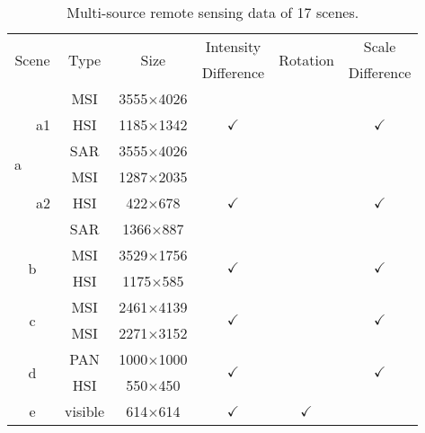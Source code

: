 \begin{table}[h!]
 \centering
 \setlength{\tabcolsep}{1.2mm}
 \caption{Multi-source remote sensing data of 17 scenes.}
 \label{tbl:data}
 \begin{tabular}{ccccccc}
  \toprule
   \multicolumn{2}{c}{\multirow{2}{*}{Scene}} & \multirow{2}{*}{Type} & \multirow{2}{*}{Size} & Intensity  & \multirow{2}{*}{Rotation} & Scale \\
                      &                       &                       &                       & Difference &                           & Difference \\
  \midrule
   \multirow{6}{*}{a} & \multirow{3}{*}{a1} &      MSI & 3555$\times$4026 & \multirow{3}{*}{$\checkmark$} &  & \multirow{3}{*}{$\checkmark$} \\
                      &                     &      HSI & 1185$\times$1342 &  &  &  \\
                      &                     &      SAR & 3555$\times$4026 &  &  &  \\
          \cline{2-7} & \multirow{3}{*}{a2} &      MSI & 1287$\times$2035 & \multirow{3}{*}{$\checkmark$} &  & \multirow{3}{*}{$\checkmark$} \\
                      &                     &      HSI &  422$\times$678  &  &  &  \\
                      &                     &      SAR & 1366$\times$887  &  &  &  \\ \cline{1-7}
   \multicolumn{2}{c}{\multirow{2}{*}{b}}   &      MSI & 3529$\times$1756 & \multirow{2}{*}{$\checkmark$} &  & \multirow{2}{*}{$\checkmark$} \\
                      &                     &      HSI & 1175$\times$585  &  &  &  \\ \cline{1-7}
   \multicolumn{2}{c}{\multirow{2}{*}{c}}   &      MSI & 2461$\times$4139 & \multirow{2}{*}{$\checkmark$} &  & \multirow{2}{*}{$\checkmark$} \\
                      &                     &      MSI & 2271$\times$3152 &  &  &  \\ \cline{1-7}
   \multicolumn{2}{c}{\multirow{2}{*}{d}}   &      PAN & 1000$\times$1000 & \multirow{2}{*}{$\checkmark$} &  & \multirow{2}{*}{$\checkmark$} \\
                      &                     &      HSI &  550$\times$450  &  &  &  \\ \cline{1-7}
   \multicolumn{2}{c}{\multirow{2}{*}{e}}   &  visible &  614$\times$614  & \multirow{2}{*}{$\checkmark$} & \multirow{2}{*}{$\checkmark$} &  \\

\end{tabular}
\end{table}
